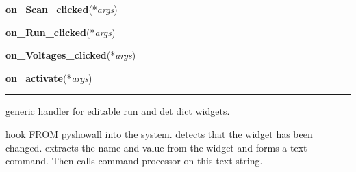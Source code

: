     \vspace{0.5ex}

    \begin{boxedminipage}{\textwidth}

    \raggedright \textbf{on\_Scan\_clicked}(*\textit{args})

    \end{boxedminipage}

    \label{pyshowall:pyshowall:on_Run_clicked}

    \vspace{0.5ex}

    \begin{boxedminipage}{\textwidth}

    \raggedright \textbf{on\_Run\_clicked}(*\textit{args})

    \end{boxedminipage}

    \label{pyshowall:pyshowall:on_Voltages_clicked}

    \vspace{0.5ex}

    \begin{boxedminipage}{\textwidth}

    \raggedright \textbf{on\_Voltages\_clicked}(*\textit{args})

    \end{boxedminipage}

    \label{pyshowall:pyshowall:on_activate}

    \vspace{0.5ex}

    \begin{boxedminipage}{\textwidth}

    \raggedright \textbf{on\_activate}(*\textit{args})

    \vspace{-1.5ex}

    \rule{\textwidth}{0.5\fboxrule}
    generic handler for editable run and det dict widgets.

    hook FROM pyshowall into the system. detects that the widget has been 
    changed. extracts the name and value from the widget and forms a text 
    command. Then calls command processor on this text string.

    \vspace{1ex}

    \end{boxedminipage}

